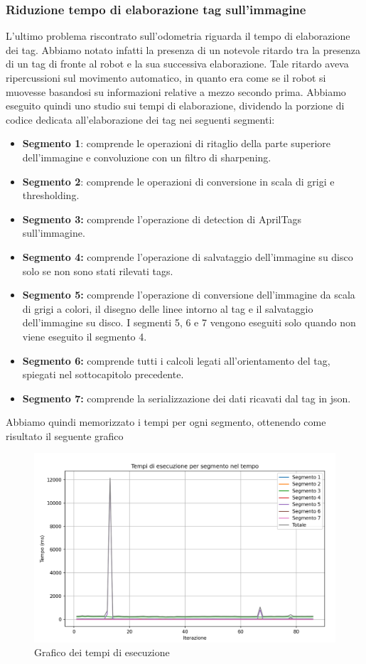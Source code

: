\documentclass[]{article}
\begin{document}
\subsubsection{Riduzione tempo di elaborazione tag sull'immagine}
L'ultimo problema riscontrato sull'odometria riguarda il tempo di elaborazione dei tag. Abbiamo notato infatti la presenza di un notevole ritardo tra la presenza di un tag di fronte al robot e la sua successiva elaborazione. Tale ritardo aveva ripercussioni sul movimento automatico, in quanto era come se il robot si muovesse basandosi su informazioni relative a mezzo secondo prima. Abbiamo eseguito quindi uno studio sui tempi di elaborazione, dividendo la porzione di codice dedicata all'elaborazione dei tag nei seguenti segmenti:
\begin{itemize}
    \item \textbf{Segmento 1}: comprende le operazioni di ritaglio della parte superiore dell'immagine e convoluzione con un filtro di sharpening.
    \item \textbf{Segmento 2}: comprende le operazioni di conversione in scala di grigi e thresholding.
    \item \textbf{Segmento 3:} comprende l'operazione di detection di AprilTags sull'immagine.
    \item \textbf{Segmento 4:} comprende l'operazione di salvataggio dell'immagine su disco solo se non sono stati rilevati tags.
    \item \textbf{Segmento 5:} comprende l'operazione di conversione dell'immagine da scala di grigi a colori, il disegno delle linee intorno al tag e il salvataggio dell'immagine su disco. I segmenti 5, 6 e 7 vengono eseguiti solo quando non viene eseguito il segmento 4.
    \item \textbf{Segmento 6:} comprende tutti i calcoli legati all'orientamento del tag, spiegati nel sottocapitolo precedente.
    \item \textbf{Segmento 7:} comprende la serializzazione dei dati ricavati dal tag in json.
\end{itemize}
Abbiamo quindi memorizzato i tempi per ogni segmento, ottenendo come risultato il seguente grafico
\begin{figure}[H]
    \centering
    \includegraphics[width=0.7\linewidth]{immagini/grafico_tags_prima_delle_modifiche_intero.png}
    \caption{Grafico dei tempi di esecuzione}
\end{figure}
\end{document}
